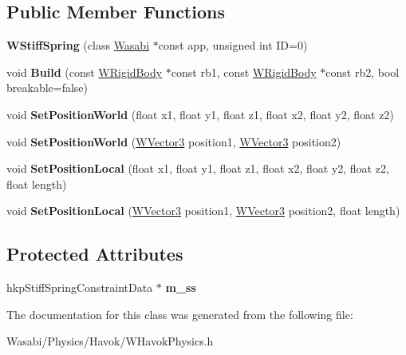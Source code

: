 \subsection*{Public Member Functions}
\begin{DoxyCompactItemize}
\item 
{\bfseries W\+Stiff\+Spring} (class \hyperlink{class_wasabi}{Wasabi} $\ast$const app, unsigned int ID=0)\hypertarget{class_w_stiff_spring_ab52ed3dbb90bdb51675e70f8ff9d2bea}{}\label{class_w_stiff_spring_ab52ed3dbb90bdb51675e70f8ff9d2bea}

\item 
void {\bfseries Build} (const \hyperlink{class_w_rigid_body}{W\+Rigid\+Body} $\ast$const rb1, const \hyperlink{class_w_rigid_body}{W\+Rigid\+Body} $\ast$const rb2, bool breakable=false)\hypertarget{class_w_stiff_spring_a6fb9feae168a64dd95ac0a127b329201}{}\label{class_w_stiff_spring_a6fb9feae168a64dd95ac0a127b329201}

\item 
void {\bfseries Set\+Position\+World} (float x1, float y1, float z1, float x2, float y2, float z2)\hypertarget{class_w_stiff_spring_a9f8a45e1db4db4ba5139e81e37dd9ed9}{}\label{class_w_stiff_spring_a9f8a45e1db4db4ba5139e81e37dd9ed9}

\item 
void {\bfseries Set\+Position\+World} (\hyperlink{class_w_vector3}{W\+Vector3} position1, \hyperlink{class_w_vector3}{W\+Vector3} position2)\hypertarget{class_w_stiff_spring_ac01f492cd7a5bb521fb57c55172ea54e}{}\label{class_w_stiff_spring_ac01f492cd7a5bb521fb57c55172ea54e}

\item 
void {\bfseries Set\+Position\+Local} (float x1, float y1, float z1, float x2, float y2, float z2, float length)\hypertarget{class_w_stiff_spring_adc98c9d0521e67d0948f4e0c44f6d1d6}{}\label{class_w_stiff_spring_adc98c9d0521e67d0948f4e0c44f6d1d6}

\item 
void {\bfseries Set\+Position\+Local} (\hyperlink{class_w_vector3}{W\+Vector3} position1, \hyperlink{class_w_vector3}{W\+Vector3} position2, float length)\hypertarget{class_w_stiff_spring_a503e4e6a3990747456d09f166c504600}{}\label{class_w_stiff_spring_a503e4e6a3990747456d09f166c504600}

\end{DoxyCompactItemize}
\subsection*{Protected Attributes}
\begin{DoxyCompactItemize}
\item 
hkp\+Stiff\+Spring\+Constraint\+Data $\ast$ {\bfseries m\+\_\+ss}\hypertarget{class_w_stiff_spring_a1a62edc379ff1ab624d1e218b0feac67}{}\label{class_w_stiff_spring_a1a62edc379ff1ab624d1e218b0feac67}

\end{DoxyCompactItemize}


The documentation for this class was generated from the following file\+:\begin{DoxyCompactItemize}
\item 
Wasabi/\+Physics/\+Havok/W\+Havok\+Physics.\+h\end{DoxyCompactItemize}
